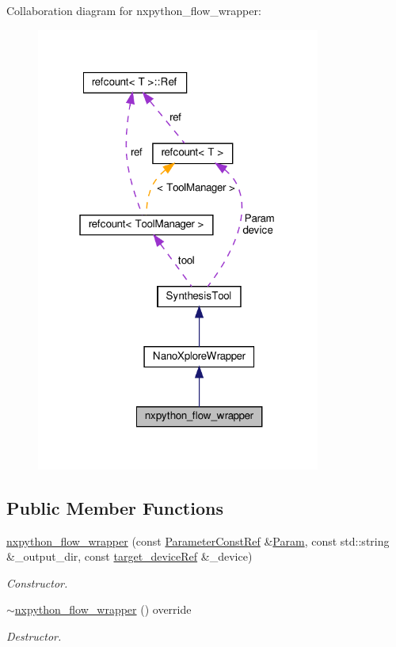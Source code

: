 Collaboration diagram for nxpython\+\_\+flow\+\_\+wrapper\+:
\nopagebreak
\begin{figure}[H]
\begin{center}
\leavevmode
\includegraphics[width=265pt]{d0/d64/classnxpython__flow__wrapper__coll__graph}
\end{center}
\end{figure}
\subsection*{Public Member Functions}
\begin{DoxyCompactItemize}
\item 
\hyperlink{classnxpython__flow__wrapper_ac5dd3f918706d2613c4380a9504ecb63}{nxpython\+\_\+flow\+\_\+wrapper} (const \hyperlink{Parameter_8hpp_a37841774a6fcb479b597fdf8955eb4ea}{Parameter\+Const\+Ref} \&\hyperlink{classSynthesisTool_a854ef102782ff4d069e1aa6d1a94d64e}{Param}, const std\+::string \&\+\_\+output\+\_\+dir, const \hyperlink{target__device_8hpp_acedb2b7a617e27e6354a8049fee44eda}{target\+\_\+device\+Ref} \&\+\_\+device)
\begin{DoxyCompactList}\small\item\em Constructor. \end{DoxyCompactList}\item 
\hyperlink{classnxpython__flow__wrapper_ace43b4bf45d41d51b46aa7504d4346c6}{$\sim$nxpython\+\_\+flow\+\_\+wrapper} () override
\begin{DoxyCompactList}\small\item\em Destructor. \end{DoxyCompactList}\end{DoxyCompactItemize}

